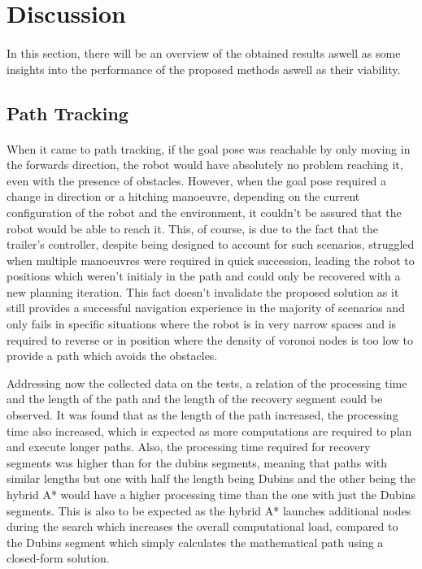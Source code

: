 \section{Discussion}
\label{sec:discussion}

\paragraph{}In this section, there will be an overview of the obtained results aswell 
as some insights into the performance of the proposed methods aswell as their viability.

\subsection{Path Tracking}
\paragraph{} When it came to path tracking, if the goal pose was reachable by only moving 
in the forwards direction, the robot would have absolutely no problem reaching it, even with 
the presence of obstacles. However, when the goal pose required a change in direction 
or a hitching manoeuvre, depending on the current configuration of the robot and the 
environment, it couldn't be assured that the robot would be able to reach it. This, 
of course, is due to the fact that the trailer's controller, despite being designed to 
account for such scenarios, struggled when multiple manoeuvres were required in quick 
succession, leading the robot to positions which weren't initialy in the path and could only 
be recovered with a new planning iteration. This fact doesn't invalidate the proposed 
solution as it still provides a successful navigation experience in the majority of 
scenarios and only fails in specific situations where the  robot is in very narrow spaces 
and is required to reverse or in position where the density of voronoi nodes is too low 
to provide a path which avoids the obstacles.

Addressing now the collected data on the tests, a relation of the processing time and the 
length of the path and the length of the recovery segment could be observed. It was found 
that as the length of the path increased, the processing time also increased, which is 
expected as more computations are required to plan and execute longer paths. Also, the processing 
time required for recovery segments was higher than for the dubins segments, meaning that 
paths with similar lengths but one with half the length being Dubins and the other being 
the hybrid A* would have a higher processing time than the one with just the Dubins segments. 
This is also to be expected as the hybrid A* launches additional nodes during the search which 
increases the overall computational load, compared to the Dubins segment which simply calculates 
the mathematical path using a closed-form solution.

